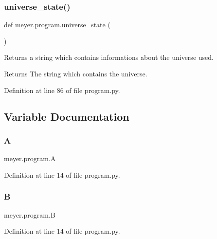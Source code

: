 \subsubsection{\texorpdfstring{universe\+\_\+state()}{universe\_state()}}
{\footnotesize\ttfamily def meyer.\+program.\+universe\+\_\+state (\begin{DoxyParamCaption}{ }\end{DoxyParamCaption})}



Returns a string which contains informations about the universe used. 

\begin{DoxyReturn}{Returns}
The string which contains the universe. 
\end{DoxyReturn}


Definition at line 86 of file program.\+py.



\subsection{Variable Documentation}
\mbox{\label{namespacemeyer_1_1program_a5439166d754be3dc1dd22114889f26f2}} 
\subsubsection{\texorpdfstring{A}{A}}
{\footnotesize\ttfamily meyer.\+program.\+A}



Definition at line 14 of file program.\+py.

\mbox{\label{namespacemeyer_1_1program_ac206af55b2b0d02e01c488d77a0830e7}} 
\subsubsection{\texorpdfstring{B}{B}}
{\footnotesize\ttfamily meyer.\+program.\+B}



Definition at line 14 of file program.\+py.

\mbox{\label{namespacemeyer_1_1program_afa493796575f275536829e18ce904c1d}} 
